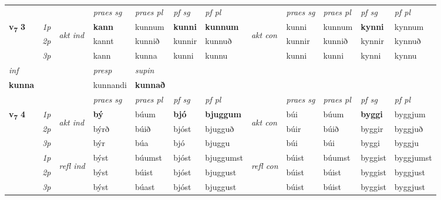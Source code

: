 \begin{longtable}[l]{X>{\footnotesize\itshape}llXXXXlXXXX}
 & &   & \textit{praes sg}  & \textit{praes pl}    & \textit{ pf sg} & \textit{pf pl} & & \textit{praes sg}  & \textit{praes pl}    & \textit{pf sg} & \textit{pf pl }  \\ \cmidrule{4-7} \cmidrule{9-12}
 \multirow{2}{*}{{{\textbf{v{\textsubscript{7}}} \Large{\textbf{3}}}}}  & 1p & \multirow{3}{*}{\begin{turn}{90}\textit{akt ind}\end{turn}} & \textbf{kann} & kunnum & \textbf{kunni} & \textbf{kunnum} & \multirow{3}{*}{\begin{turn}{90}\textit{akt con}\end{turn}} &kunni & kunnum & \textbf{kynni} & kynnum\\*
 & 2p &  &  kannt  & kunnið & kunnir & kunnuð & & kunnir & kunnið & kynnir & kynnuð \\*
 & 3p &  & kann & kunna & kunni & kunnu & & kunni & kunni& kynni & kynnu \\*
\cmidrule{4-7} \cmidrule{9-12}

   {\textit{inf}} & &     & \textit{presp} & \textit{supin}   \\*
  {\textbf{kunna}} & &     & kunnandi &  \textbf{kunnað}   \\*

\midrule

 & &   & \textit{praes sg}  & \textit{praes pl}    & \textit{ pf sg} & \textit{pf pl} & & \textit{praes sg}  & \textit{praes pl}    & \textit{pf sg} & \textit{pf pl }  \\ \cmidrule{4-7} \cmidrule{9-12}
 \multirow{2}{*}{{{\textbf{v{\textsubscript{7}}} \Large{\textbf{4}}}}}  & 1p & \multirow{3}{*}{\begin{turn}{90}\textit{akt ind}\end{turn}} & \textbf{bý} & búum & \textbf{bjó} & \textbf{bjuggum} & \multirow{3}{*}{\begin{turn}{90}\textit{akt con}\end{turn}} &búi & búum & \textbf{byggi} & byggjum\\*
 & 2p &  &  býrð  & búið & bjóst & bjugguð & & búir & búið & byggir & byggjuð \\*
 & 3p &  & býr & búa & bjó & bjuggu & & búi & búi& byggi & byggju \\*
\cmidrule{4-7} \cmidrule{9-12}
 & 1p & \multirow{3}{*}{\begin{turn}{90}\textit{refl ind}\end{turn}}  & býst & búumst & bjóst & bjuggumst & \multirow{3}{*}{\begin{turn}{90}\textit{refl con}\end{turn}}  &búist & búumst & byggist & byggjumst \\*
 & 2p &  & býst & búist & bjóst & bjuggust & &búist & búist & byggist & byggjust \\*
 & 3p  & & býst & búast & bjóst & bjuggust & & búist & búist& byggist & byggjust \\*
\cmidrule{4-7} \cmidrule{9-12}


\end{longtable}
